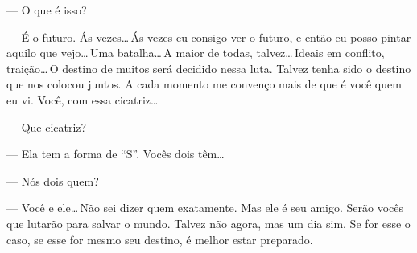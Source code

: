 --- O que é isso?

--- É o futuro. Ás vezes\ldots\,Ás vezes eu consigo ver o futuro, e
então eu posso pintar aquilo que vejo\ldots\,Uma batalha\ldots\,A maior
de todas, talvez\ldots\,Ideais em conflito, traição\ldots\,O destino de
muitos será decidido nessa luta. Talvez tenha sido o destino que nos
colocou juntos. A cada momento me convenço mais de que é você quem eu
vi. Você, com essa cicatriz\ldots

--- Que cicatriz?

--- Ela tem a forma de “S”. Vocês dois têm\ldots

--- Nós dois quem?

--- Você e ele\ldots\,Não sei dizer quem exatamente. Mas ele é seu
amigo. Serão vocês que lutarão para salvar o mundo. Talvez não agora,
mas um dia sim. Se for esse o caso, se esse for mesmo seu destino, é
melhor estar preparado.
